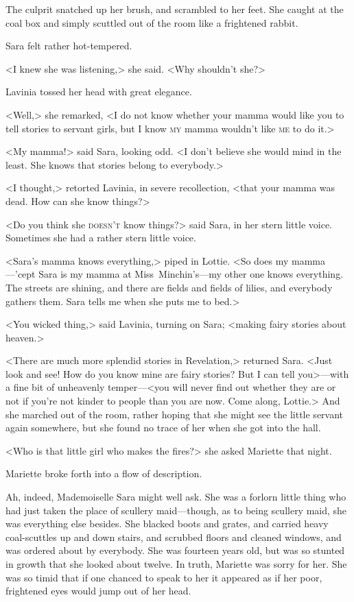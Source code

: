 The culprit snatched up her brush, and scrambled to her feet. She caught at the coal box and simply scuttled out of the room like a frightened rabbit.

Sara felt rather hot-tempered.

<I knew she was listening,> she said. <Why shouldn't she?>

Lavinia tossed her head with great elegance.

<Well,> she remarked, <I do not know whether your mamma would like you to tell stories to servant girls, but I know \textsc{my} mamma wouldn't like \textsc{me} to do it.>

<My mamma!> said Sara, looking odd. <I don't believe she would mind in the least. She knows that stories belong to everybody.>

<I thought,> retorted Lavinia, in severe recollection, <that your mamma was dead. How can she know things?>

<Do you think she \textsc{doesn't} know things?> said Sara, in her stern little voice. Sometimes she had a rather stern little voice.

<Sara's mamma knows everything,> piped in Lottie. <So does my mamma—'cept Sara is my mamma at Miss~Minchin's—my other one knows everything. The streets are shining, and there are fields and fields of lilies, and everybody gathers them. Sara tells me when she puts me to bed.>

<You wicked thing,> said Lavinia, turning on Sara; <making fairy stories about heaven.>

<There are much more splendid stories in Revelation,> returned Sara. <Just look and see! How do you know mine are fairy stories? But I can tell you>—with a fine bit of unheavenly temper—<you will never find out whether they are or not if you're not kinder to people than you are now. Come along, Lottie.> And she marched out of the room, rather hoping that she might see the little servant again somewhere, but she found no trace of her when she got into the hall.

<Who is that little girl who makes the fires?> she asked Mariette that night.

Mariette broke forth into a flow of description.

Ah, indeed, Mademoiselle Sara might well ask. She was a forlorn little thing who had just taken the place of scullery maid—though, as to being scullery maid, she was everything else besides. She blacked boots and grates, and carried heavy coal-scuttles up and down stairs, and scrubbed floors and cleaned windows, and was ordered about by everybody. She was fourteen years old, but was so stunted in growth that she looked about twelve. In truth, Mariette was sorry for her. She was so timid that if one chanced to speak to her it appeared as if her poor, frightened eyes would jump out of her head.

